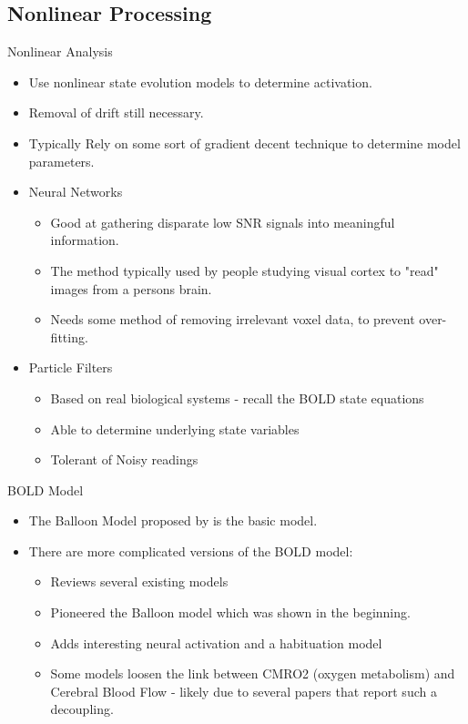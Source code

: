 \documentclass{beamer}
\begin{document}
\subsection{Nonlinear Processing}
\begin{frame}{Nonlinear Analysis}
\begin{itemize}
    \item Use nonlinear state evolution models to determine activation.
    \item Removal of drift still necessary.
    \item Typically Rely on some sort of gradient decent technique to determine
        model parameters.
    \item Neural Networks
    \begin{itemize}
        \item Good at gathering disparate low SNR signals into meaningful information. 
        \item The method typically used by people studying visual cortex to "read" images from 
            a persons brain.
        \item Needs some method of removing irrelevant voxel data, to prevent over-fitting.
    \end{itemize}
    \item Particle Filters
    \begin{itemize}
        \item Based on real biological systems - recall the BOLD state equations
        \item Able to determine underlying state variables
        \item Tolerant of Noisy readings
    \end{itemize}
\end{itemize}
\end{frame}

\begin{frame}{BOLD Model}
\begin{itemize}
    \item The Balloon Model proposed by \cite{ISI:000073759600002} is the basic model.
    \item There are more complicated versions of the BOLD model:
    \begin{itemize}
        \item \cite{ISI:000240969200015} Reviews several existing models
        \item \cite{Buxton2004S220} Pioneered the Balloon model which was shown in the beginning.
        \item \cite{ISI:000234015300018} Adds interesting neural activation and a habituation model
        \item Some models loosen the link between CMRO2 (oxygen metabolism)
            and Cerebral Blood Flow - likely due to several papers that report
            such a decoupling.
    \end{itemize}
\end{itemize}
\end{frame}
\end{document}
